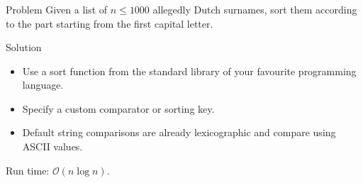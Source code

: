 \begin{frame}
    \frametitle{\problemtitle}
    \begin{block}{Problem}
        Given a list of $n\leq1000$ allegedly Dutch surnames, sort them according to the part starting from the first capital letter.
    \end{block}
    \pause
    \begin{block}{Solution}
        \begin{itemize}
            \item Use a sort function from the standard library of your favourite programming language.
            \item Specify a custom comparator or sorting key.
            \item Default string comparisons are already lexicographic and compare using ASCII values.
        \end{itemize}
        Run time: $\mathcal O(n\log n)$.
    \end{block}
    \pause
    \solvestats
\end{frame}
